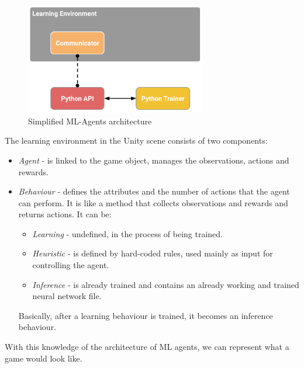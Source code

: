 \documentclass[a4paper,12pt,openright]{book}
\begin{document}
\begin{figure}[h]
\begin{center}
\includegraphics[width=0.7\textwidth]{Images/learning_environment_basic.png}
\end{center}
\caption{Simplified ML-Agents architecture \cite{MLAgents}}
\label{pic6}
\end{figure}


\clearpage

The learning environment in the Unity scene consists of two components:
\begin{itemize} 
    \item \emph{Agent} - is linked to the game object, manages the observations, actions and rewards. 
    \item \emph{Behaviour} - defines the attributes and the number of actions that the agent can perform. It is like a method that collects observations and rewards and returns actions. It can be: 
    \begin{itemize} 
        \item \emph{Learning} - undefined, in the process of being trained. 
        \item \emph{Heuristic} - is defined by hard-coded rules, used mainly as input for controlling the agent. \item \emph{Inference} - is already trained and contains an already working and trained neural network file. 
    \end{itemize} 
    Basically, after a learning behaviour is trained, it becomes an inference behaviour.
\end{itemize}

With this knowledge of the architecture of ML agents, we can represent what a game would look like.
\end{document}
